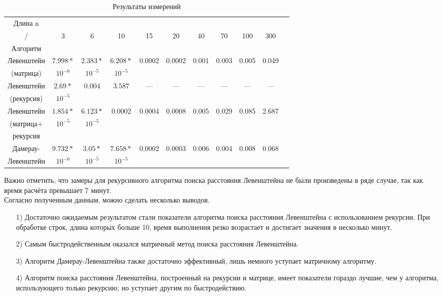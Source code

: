 \documentclass[12pt]{report}
\begin{document}
\begin{table}[ph] \label{table_4_1}
	\caption{Результаты измерений}
	\centering
	\begin{tabular}{|c|c|c|c|c|c|c|c|c|c|c|}
		\hline
		Длина n&&&&&&&&&\\
		/    &3 & 6 & 10 & 15 & 20 & 40 & 70 & 100 & 300\\
		Алгоритм    &&&&&&&&&\\
		\hline
		Левенштейн & $7.998*$ & $2.383*$ & $6.208*$ & 0.0002 & 0.0002 & 0.001 & 0.003 & 0.005 & 0.049\\
		(матрица) &$10^{-6}$&$10^{-5}$&$10^{-5}$&&&&&&\\
		\hline
		Левенштейн & $2.69*$ & $0.004$ & $3.587$ &---&---&---&---&---&---\\
		(рекурсия) &$10^{-5}$&&&&&&&&\\
		\hline
		Левенштейн & $1.854*$ & $6.123*$ & $0.0002$ & 0.0004 & 0.0008 & 0.005 & 0.029 & 0.085 & 2.687\\
		(матрица+ &$10^{-5}$&$10^{-5}$&&&&&&&\\
		рекурсия &&&&&&&&&\\
		\hline
		Дамерау- & $9.732*$ & $3.05*$ & $7.658*$ & 0.0002 & 0.0003 & 0.006 & 0.004 & 0.008 & 0.068\\
		Левенштейн &$10^{-6}$&$10^{-5}$&$10^{-5}$&&&&&&\\
		\hline	
	\end{tabular}
\end{table}

Важно отметить, что замеры для рекурсивного алгоритма поиска расстояния Левенштейна не были произведены в ряде случае, так как время расчёта превышает 7 минут.\\

Согласно полученным данным, можно сделать несколько выводов.
\begin{enumerate}
	\item[1)]Достаточно ожидаемым результатом стали показатели алгоритма поиска расстояния Левенштейна с использованием рекурсии. При обработке строк, длина которых больше 10, время выполнения резко возрастает и достигает значения в несколько минут.
	\item[2)]Самым быстродейственным оказался матричный метод поиска расстояния Левенштейна.
	\item[3)]Алгоритм Дамерау-Левенштейна также достаточно эффективный, лишь немного уступает матричному алгоритму.
	\item[4)]Алгоритм поиска расстояния Левенштейна, построенный на рекурсии и матрице, имеет показатели гораздо лучшие, чем у алгоритма, использующего только рекурсию; но уступает другим по быстродействию.
\end{enumerate}
\end{document}
